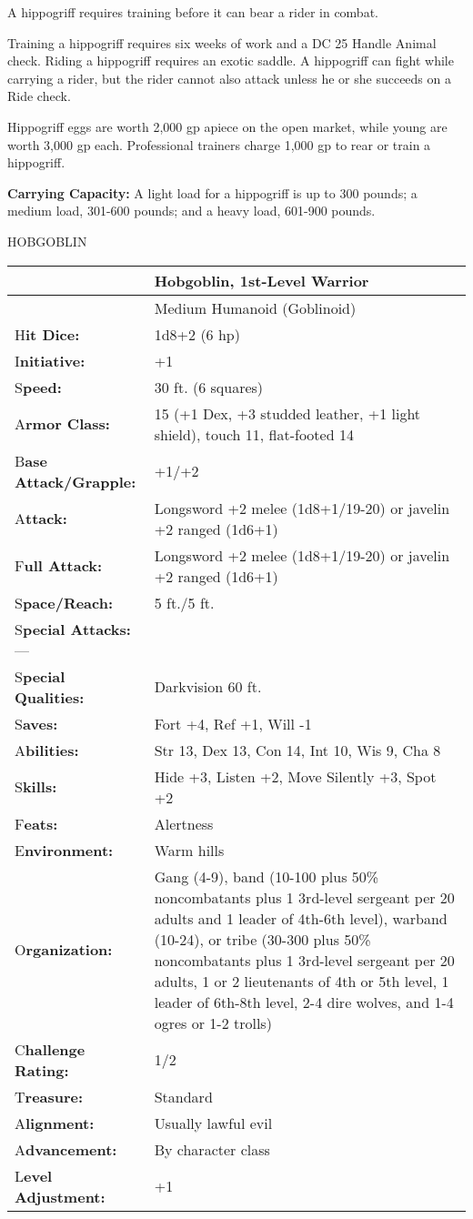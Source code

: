 \documentclass{article}
\begin{document}
A hippogriff requires training before it can bear a rider in combat.

Training a hippogriff requires six weeks of work and a DC 25 Handle Animal check. 
Riding a hippogriff requires an exotic saddle. A hippogriff can fight while carrying 
a rider, but the rider cannot also attack unless he or she succeeds on a Ride check. 

Hippogriff eggs are worth 2,000 gp apiece on the open market, while young are worth 
3,000 gp each. Professional trainers charge 1,000 gp to rear or train a hippogriff.

\textbf{Carrying Capacity:} A light load for a hippogriff is up to 300 pounds; 
a medium load, 301-600 pounds; and a heavy load, 601-900 pounds.

\vspace{12pt}
{\LARGE{}HOBGOBLIN}

\begin{tabular}{|>{\raggedright}p{78pt}|>{\raggedright}p{247pt}|}
\hline
  & H\textbf{obgoblin, 1st-Level Warrior}\tabularnewline
\hline
  & Medium Humanoid (Goblinoid)\tabularnewline
\hline
H\textbf{it Dice:} & 1d8+2 (6 hp)\tabularnewline
\hline
I\textbf{nitiative:} & +1\tabularnewline
\hline
S\textbf{peed:} & 30 ft. (6 squares)\tabularnewline
\hline
A\textbf{rmor Class:} & 15 (+1 Dex, +3 studded leather, +1 light shield), touch 
11, flat-footed 14\tabularnewline
\hline
B\textbf{ase Attack/Grapple:} & +1/+2\tabularnewline
\hline
A\textbf{ttack:} & Longsword +2 melee (1d8+1/19-20) or javelin +2 ranged (1d6+1)\tabularnewline
\hline
F\textbf{ull Attack:} & Longsword +2 melee (1d8+1/19-20) or javelin +2 ranged (1d6+1)\tabularnewline
\hline
S\textbf{pace/Reach:} & 5 ft./5 ft.\tabularnewline
\hline
S\textbf{pecial Attacks:}--- & \tabularnewline
\hline
S\textbf{pecial Qualities:} & Darkvision 60 ft.\tabularnewline
\hline
S\textbf{aves:} & Fort +4, Ref +1, Will -1\tabularnewline
\hline
A\textbf{bilities:} & Str 13, Dex 13, Con 14, Int 10, Wis 9, Cha 8\tabularnewline
\hline
S\textbf{kills:} & Hide +3, Listen +2, Move Silently +3, Spot +2\tabularnewline
\hline
F\textbf{eats:} & Alertness\tabularnewline
\hline
E\textbf{nvironment:} & Warm hills\tabularnewline
\hline
O\textbf{rganization:} & Gang (4-9), band (10-100 plus 50\% noncombatants plus 
1 3rd-level sergeant per 20 adults and 1 leader of 4th-6th level), warband (10-24), 
or tribe (30-300 plus 50\% noncombatants plus 1 3rd-level sergeant per 20 adults, 
1 or 2 lieutenants of 4th or 5th level, 1 leader of 6th-8th level, 2-4 dire wolves, 
and 1-4 ogres or 1-2 trolls)\tabularnewline
\hline
C\textbf{hallenge Rating:} & 1/2\tabularnewline
\hline
T\textbf{reasure:} & Standard\tabularnewline
\hline
A\textbf{lignment:} & Usually lawful evil\tabularnewline
\hline
A\textbf{dvancement:} & By character class\tabularnewline
\hline
L\textbf{evel Adjustment:} & +1\tabularnewline
\hline
\end{tabular}
\end{document}

